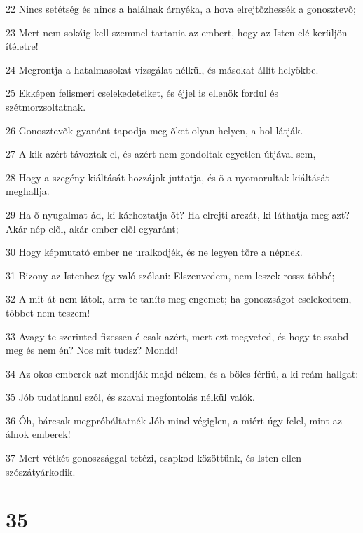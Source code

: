 \par 22 Nincs setétség és nincs a halálnak árnyéka, a hova elrejtõzhessék a gonosztevõ;
\par 23 Mert nem sokáig kell szemmel tartania az embert, hogy az Isten elé kerüljön ítéletre!
\par 24 Megrontja a hatalmasokat vizsgálat nélkül, és másokat állít helyökbe.
\par 25 Ekképen felismeri cselekedeteiket, és éjjel is ellenök fordul és szétmorzsoltatnak.
\par 26 Gonosztevõk gyanánt tapodja meg õket olyan helyen, a hol látják.
\par 27 A kik azért távoztak el, és azért nem gondoltak egyetlen útjával sem,
\par 28 Hogy a szegény kiáltását hozzájok juttatja, és õ a nyomorultak kiáltását meghallja.
\par 29 Ha õ nyugalmat ád, ki kárhoztatja õt? Ha elrejti arczát, ki láthatja meg azt? Akár nép elõl, akár ember elõl egyaránt;
\par 30 Hogy képmutató ember ne uralkodjék, és ne legyen tõre a népnek.
\par 31 Bizony az Istenhez így való szólani: Elszenvedem, nem leszek rossz többé;
\par 32 A mit át nem látok, arra te taníts meg engemet; ha gonoszságot cselekedtem, többet nem teszem!
\par 33 Avagy te szerinted fizessen-é csak azért, mert ezt megveted, és hogy te szabd meg és nem én? Nos mit tudsz? Mondd!
\par 34 Az okos emberek azt mondják majd nékem, és a bölcs férfiú, a ki reám hallgat:
\par 35 Jób tudatlanul szól, és szavai megfontolás nélkül valók.
\par 36 Óh, bárcsak megpróbáltatnék Jób mind végiglen, a miért úgy felel, mint az álnok emberek!
\par 37 Mert vétkét gonoszsággal tetézi, csapkod közöttünk, és Isten ellen szószátyárkodik.

\chapter{35}

